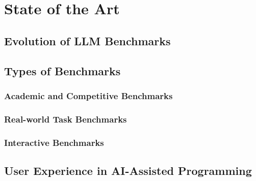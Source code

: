 \chapter{State of the Art}
\section{Evolution of LLM Benchmarks}

\section{Types of Benchmarks}
\subsection{Academic and Competitive Benchmarks}

\subsection{Real-world Task Benchmarks}

\subsection{Interactive Benchmarks}

\section{User Experience in AI-Assisted Programming}

